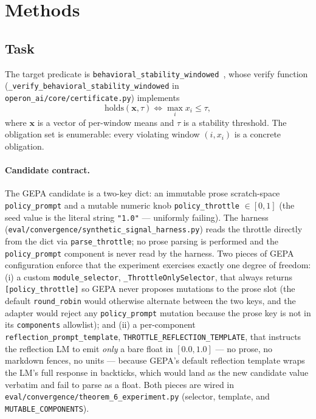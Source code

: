 \section{Methods}\label{sec:methods}

\subsection{Task}\label{sec:task}

The target predicate is
\texttt{behavioral\_stability\_windowed}~\cite{banu2026operon}, whose
verify function
(\texttt{\_verify\_behavioral\_stability\_windowed} in
\texttt{operon\_ai/core/certificate.py}) implements
\[
\mathrm{holds}(\mathbf{x}, \tau) \iff \max_{i} x_i \le \tau,
\]
where $\mathbf{x}$ is a vector of per-window means and $\tau$ is a
stability threshold.  The obligation set is enumerable: every
violating window $(i, x_i)$ is a concrete obligation.

\paragraph{Candidate contract.}  The GEPA candidate is a two-key
dict: an immutable prose scratch-space \texttt{policy\_prompt} and a
mutable numeric knob \texttt{policy\_throttle} $\in [0, 1]$ (the seed
value is the literal string \texttt{"1.0"} --- uniformly failing).
The harness
(\texttt{eval/convergence/synthetic\_signal\_harness.py}) reads the
throttle directly from the dict via \texttt{parse\_throttle}; no
prose parsing is performed and the \texttt{policy\_prompt} component
is never read by the harness.  Two pieces of GEPA configuration
enforce that the experiment exercises exactly one degree of freedom:
(i) a custom \texttt{module\_selector}, \texttt{\_ThrottleOnlySelector},
that always returns \texttt{[policy\_throttle]} so GEPA never
proposes mutations to the prose slot (the default
\texttt{round\_robin} would otherwise alternate between the two
keys, and the adapter would reject any \texttt{policy\_prompt}
mutation because the prose key is not in its \texttt{components}
allowlist); and (ii) a per-component
\texttt{reflection\_prompt\_template},
\texttt{THROTTLE\_REFLECTION\_TEMPLATE}, that instructs the
reflection LM to emit \emph{only} a bare float in $[0.0, 1.0]$
--- no prose, no markdown fences, no units --- because GEPA's
default reflection template wraps the LM's full response in
backticks, which would land as the new candidate value verbatim and
fail to parse as a float.  Both pieces are wired in
\texttt{eval/convergence/theorem\_6\_experiment.py} (selector,
template, and \texttt{MUTABLE\_COMPONENTS}).

